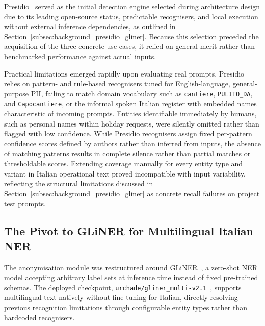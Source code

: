 Presidio~\cite{microsoft2018presidio} served as the initial detection engine selected during architecture design due to its leading open-source status, predictable recognisers, and local execution without external inference dependencies, as outlined in Section~\ref{subsec:background_presidio_gliner}. Because this selection preceded the acquisition of the three concrete use cases, it relied on general merit rather than benchmarked performance against actual inputs.

Practical limitations emerged rapidly upon evaluating real prompts. Presidio relies on pattern- and rule-based recognisers tuned for English-language, general-purpose PII, failing to match domain vocabulary such as \texttt{cantiere}, \texttt{PULITO\_DA}, and \texttt{Capocantiere}, or the informal spoken Italian register with embedded names characteristic of incoming prompts. Entities identifiable immediately by humans, such as personal names within holiday requests, were silently omitted rather than flagged with low confidence. While Presidio recognisers assign fixed per-pattern confidence scores defined by authors rather than inferred from inputs, the absence of matching patterns results in complete silence rather than partial matches or thresholdable scores. Extending coverage manually for every entity type and variant in Italian operational text proved incompatible with input variability, reflecting the structural limitations discussed in Section~\ref{subsec:background_presidio_gliner} as concrete recall failures on project test prompts.

\subsection{The Pivot to GLiNER for Multilingual Italian NER}
\label{subsec:impl_gliner_pivot}

The anonymisation module was restructured around GLiNER~\cite{zaratiana2023gliner}, a zero-shot NER model accepting arbitrary label sets at inference time instead of fixed pre-trained schemas. The deployed checkpoint, \texttt{urchade/gliner\_multi-v2.1}~\cite{zaratiana2024glinermultiv21}, supports multilingual text natively without fine-tuning for Italian, directly resolving previous recognition limitations through configurable entity types rather than hardcoded recognisers.


